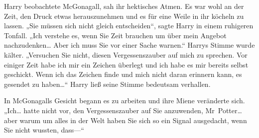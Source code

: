 Harry beobachtete McGonagall, sah ihr hektisches Atmen. Es war wohl an der Zeit, den Druck etwas herauszunehmen und es für eine Weile in ihr köcheln zu lassen. „Sie müssen sich nicht gleich entscheiden“, sagte Harry in einem ruhigeren Tonfall. „Ich verstehe es, wenn Sie Zeit brauchen um über mein Angebot nachzudenken… Aber ich muss Sie vor einer Sache warnen.“ Harrys Stimme wurde kälter. „Versuchen Sie nicht, diesen Vergessenszauber auf mich zu sprechen. Vor einiger Zeit habe ich mir ein Zeichen überlegt und ich habe es mir bereits selbst geschickt. Wenn ich das Zeichen finde und mich nicht daran erinnern kann, es gesendet zu haben…“ Harry ließ seine Stimme bedeutsam verhallen.

In McGonagalls Gesicht begann es zu arbeiten und ihre Miene veränderte sich. „Ich… hatte nicht vor, den Vergessenszauber auf Sie anzuwenden, Mr~Potter… aber warum um alles in der Welt haben Sie sich so ein Signal ausgedacht, wenn Sie nicht wussten, dass—“

